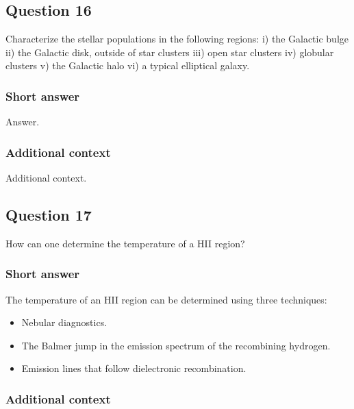 \documentclass[a4paper,10pt]{article}
\begin{document}

\newpage
\subsection{Question 16}

Characterize the stellar populations in the following regions: i) the Galactic bulge ii) the Galactic disk, outside of star clusters iii) open star clusters iv) globular clusters v) the Galactic halo vi) a typical elliptical galaxy.

\subsubsection{Short answer}

Answer.

\subsubsection{Additional context}

Additional context.


\newpage
\subsection{Question 17}

How can one determine the temperature of a HII region?

\subsubsection{Short answer}

The temperature of an HII region can be determined using three techniques:

\begin{itemize}
    \item Nebular diagnostics.
    \item The Balmer jump in the emission spectrum of the recombining hydrogen.
    \item Emission lines that follow dielectronic recombination.
\end{itemize}

\subsubsection{Additional context}
\end{document}
